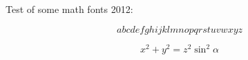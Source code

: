 \documentclass[rm]{beamer}
\begin{document}
Test of some math fonts 2012:

\[
abcdefghijklmnopqrstuvwxyz
\]

\[
x^2 + y^2 = z^2 \sin^2 \alpha
\]
\end{document}

